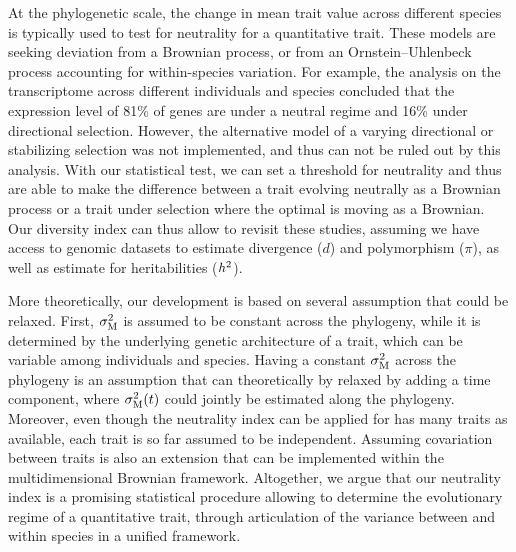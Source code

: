 \documentclass{article}
\begin{document}
At the phylogenetic scale, the change in mean trait value across different species is typically used to test for neutrality for a quantitative trait.
These models are seeking deviation from a Brownian process\cite{catalan_drift_2019}, or from an Ornstein–Uhlenbeck process accounting for within-species variation\cite{rohlfs_phylogenetic_2015}.
For example, the analysis on the transcriptome across different individuals and species concluded that the expression level of 81\% of genes are under a neutral regime and 16\% under directional selection\cite{catalan_drift_2019}.
However, the alternative model of a varying directional or stabilizing selection was not implemented, and thus can not be ruled out by this analysis.
With our statistical test, we can set a threshold for neutrality and thus are able to make the difference between a trait evolving neutrally as a Brownian process or a trait under selection where the optimal is moving as a Brownian.
Our diversity index can thus allow to revisit these studies, assuming we have access to genomic datasets to estimate divergence ($d$) and polymorphism ($\pi$), as well as estimate for heritabilities ($h^2$).


More theoretically, our development is based on several assumption that could be relaxed.
First, $\sigma^2_{\mathrm{M}}$ is assumed to be constant across the phylogeny, while it is determined by the underlying genetic architecture of a trait, which can be variable among individuals and species.
Having a constant $\sigma^2_{\mathrm{M}}$ across the phylogeny is an assumption that can theoretically by relaxed by adding a time component\cite{arnold_understanding_2008, hohenlohe_mipod_2008}, where $\sigma^2_{\mathrm{M}}(t)$ could jointly be estimated along the phylogeny\cite{kostikova_bridging_2016, gaboriau_multiplatform_2020}.
Moreover, even though the neutrality index can be applied for has many traits as available, each trait is so far assumed to be independent.
Assuming covariation between traits is also an extension that can be implemented within the multidimensional Brownian framework\cite{huelsenbeck_detecting_2003, lartillot_phylogenetic_2011, lartillot_joint_2012}.
Altogether, we argue that our neutrality index is a promising statistical procedure allowing to determine the evolutionary regime of a quantitative trait, through articulation of the variance between and within species in a unified framework.
\end{document}
